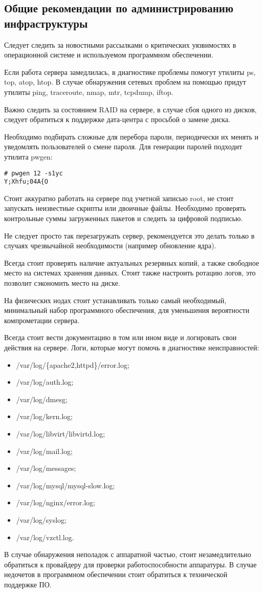 \subsection{Общие рекомендации по администрированию инфраструктуры}

Следует следить за новостными рассылками о критических уязвимостях в операционной системе и используемом программном обеспечении.

Если работа сервера замедлилась, в диагностике проблемы помогут утилиты ps, top, atop, htop.
В случае обнаружения сетевых проблем на помощью придут утилиты ping, traceroute, nmap, mtr, tcpdump, iftop.

Важно следить за состоянием RAID на сервере, в случае сбоя одного из дисков, следует обратиться к поддержке дата-центра с просьбой о замене диска.

Необходимо подбирать сложные для перебора пароли, периодически их менять и уведомлять пользователей о смене пароля.
Для генерации паролей подходит утилита pwgen:
\begin{lstlisting}
# pwgen 12 -s1yc
Y;Xhfu;04A{O
\end{lstlisting}

Стоит аккуратно работать на сервере под учетной записью root, не стоит запускать неизвестные скрипты или двоичные файлы.
Необходимо проверять контрольные суммы загруженных пакетов и следить за цифровой подписью.

Не следует просто так перезагружать сервер, рекомендуется это делать только в случаях чрезвычайной необходимости (например обновление ядра).

Всегда стоит проверять наличие актуальных резервных копий, а также свободное место на системах хранения данных.
Стоит также настроить ротацию логов, это позволит сэкономить место на диске.

На физических нодах стоит устанавливать только самый необходимый, минимальный набор программного обеспечения, для уменьшения вероятности компрометации сервера.

Всегда стоит вести документацию в том или ином виде и логировать свои действия на сервере.
Логи, которые могут помочь в диагностике неисправностей:
\begin{itemize}
  \item /var/log/\{apache2,httpd\}/error.log;
  \item /var/log/auth.log;
  \item /var/log/dmesg;
  \item /var/log/kern.log;
  \item /var/log/libvirt/libvirtd.log;
  \item /var/log/mail.log;
  \item /var/log/messages;
  \item /var/log/mysql/mysql-slow.log;
  \item /var/log/nginx/error.log;
  \item /var/log/syslog;
  \item /var/log/vzctl.log.
\end{itemize}

В случае обнаружения неполадок с аппаратной частью, стоит незамедлительно обратиться к провайдеру для проверки работоспособности аппаратуры.
В случае недочетов в программном обеспечении стоит обратиться к технической поддержке ПО.

\clearpage